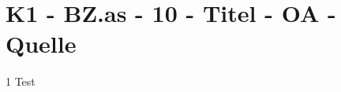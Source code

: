 \section{K1 - BZ.as - 10 - Titel - OA - Quelle}

\begin{langesbeispiel} \item[1] %
Test
\end{langesbeispiel}